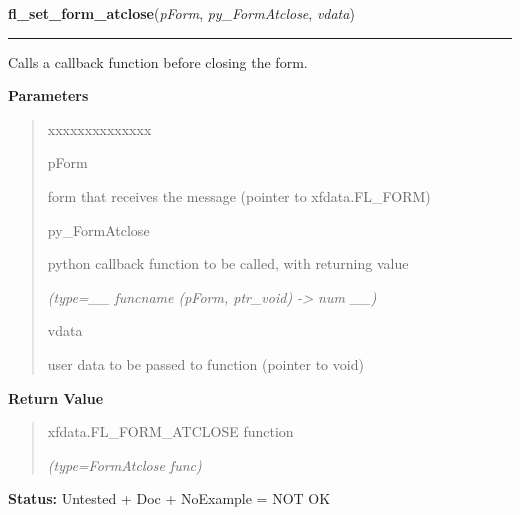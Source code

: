 \hspace{.8\funcindent}\begin{boxedminipage}{\funcwidth}

    \raggedright \textbf{fl\_set\_form\_atclose}(\textit{pForm}, \textit{py\_FormAtclose}, \textit{vdata})

    \vspace{-1.5ex}

    \rule{\textwidth}{0.5\fboxrule}
\setlength{\parskip}{2ex}
    Calls a callback function before closing the form.

\setlength{\parskip}{1ex}
      \textbf{Parameters}
      \vspace{-1ex}

      \begin{quote}
        \begin{Ventry}{xxxxxxxxxxxxxx}

          \item[pForm]

          form that receives the message (pointer to xfdata.FL\_FORM)

          \item[py\_FormAtclose]

          python callback function to be called, with returning value

            {\it (type=\_\_ funcname (pForm, ptr\_void) -{\textgreater} num \_\_)}

          \item[vdata]

          user data to be passed to function (pointer to void)

        \end{Ventry}

      \end{quote}

      \textbf{Return Value}
    \vspace{-1ex}

      \begin{quote}
      xfdata.FL\_FORM\_ATCLOSE function

      {\it (type=FormAtclose func)}

      \end{quote}

\textbf{Status:} Untested + Doc + NoExample = NOT OK



    \end{boxedminipage}

    \label{xformslib:library:fl_set_atclose}

